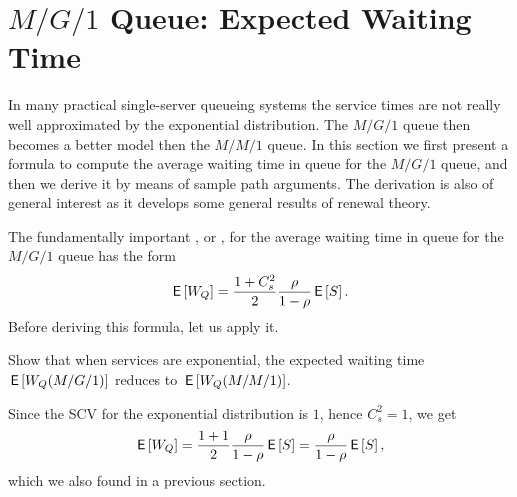 \section{$M/G/1$ Queue: Expected Waiting Time}
\label{sec:mg1}




In many practical single-server queueing systems the service times are not really well approximated by the exponential distribution.
The $M/G/1$ queue then becomes a better model then the $M/M/1$ queue.
In this section we first present a formula to compute the average waiting time in queue for the $M/G/1$ queue, and then we derive it by means of sample path arguments.
The derivation is also of general interest as it develops some general results of renewal theory.


The fundamentally important , or , for the average waiting time in queue for the $M/G/1$ queue has the form
\begin{equation} \label{eq:710}
  \,\mathsf{E}\left[W_Q\right] = \frac{1 + C_s^2}2 \frac{\rho}{1-\rho}  \,\mathsf{E}\left[S\right].
\end{equation}
Before deriving this formula, let us apply it.

\begin{extra}
  Show that when services are exponential, the expected waiting time $\,\mathsf{E}\left[W_Q(M/G/1)\right]$ reduces to $\,\mathsf{E}\left[W_Q(M/M/1)\right]$.
    \begin{solution}
      Since the SCV for the exponential distribution is $1$, hence
      $C_s^2=1$, we get 
    \begin{equation*}
\,\mathsf{E}\left[W_Q\right] = \frac{1+1}2\frac{\rho}{1-\rho} \,\mathsf{E}\left[S\right] = \frac{\rho}{1-\rho} \,\mathsf{E}\left[S\right],
    \end{equation*}
which we also found in a previous section.
    \end{solution}
\end{extra}


